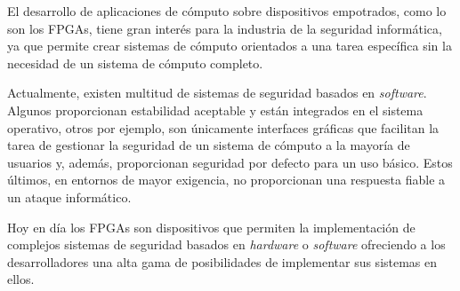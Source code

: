
El desarrollo de aplicaciones de c\'omputo sobre dispositivos
empotrados, como lo son los FPGAs, tiene gran inter\'es para la industria de
la seguridad inform\'atica, ya que permite crear sistemas de c\'omputo
orientados a una tarea espec\'ifica sin la necesidad de un sistema de
c\'omputo completo.

Actualmente, existen multitud de sistemas de seguridad basados en
\emph{software}. Algunos proporcionan estabilidad aceptable y están integrados
en el sistema operativo, otros por ejemplo, son únicamente interfaces gráficas
que facilitan la tarea de gestionar la seguridad de un sistema de cómputo a la
mayoría de usuarios y, además, proporcionan seguridad por defecto para un uso
básico. Estos últimos, en entornos de mayor exigencia, no proporcionan una
respuesta fiable a un ataque informático.

Hoy en d\'ia los FPGAs son dispositivos que permiten la implementaci\'on de
complejos sistemas de seguridad basados en \emph{hardware} o \emph{software}
ofreciendo a los desarrolladores una alta gama de posibilidades de implementar
sus sistemas en ellos.


